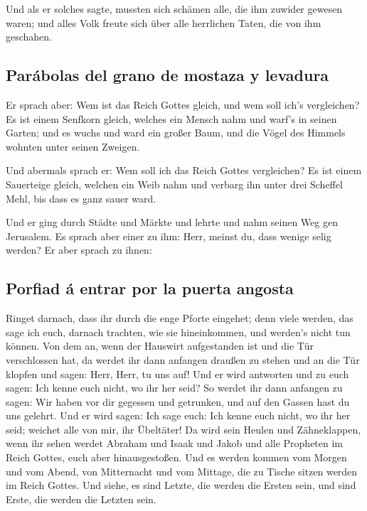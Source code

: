  Und als er solches sagte, mussten sich schämen alle, die
ihm zuwider gewesen waren; und alles Volk freute sich über alle
herrlichen Taten, die von ihm geschahen.

\hypertarget{paruxe1bolas-del-grano-de-mostaza-y-levadura}{%
\subsection{Parábolas del grano de mostaza y
levadura}\label{paruxe1bolas-del-grano-de-mostaza-y-levadura}}

 Er sprach aber: Wem ist das Reich Gottes gleich, und wem
soll ich's vergleichen?  Es ist einem Senfkorn gleich,
welches ein Mensch nahm und warf's in seinen Garten; und es wuchs und
ward ein großer Baum, und die Vögel des Himmels wohnten unter seinen
Zweigen.

 Und abermals sprach er: Wem soll ich das Reich Gottes
vergleichen?  Es ist einem Sauerteige gleich, welchen ein
Weib nahm und verbarg ihn unter drei Scheffel Mehl, bis dass es ganz
sauer ward.

 Und er ging durch Städte und Märkte und lehrte und nahm
seinen Weg gen Jerusalem.  Es sprach aber einer zu ihm:
Herr, meinst du, dass wenige selig werden? Er aber sprach zu ihnen:

\hypertarget{porfiad-uxe1-entrar-por-la-puerta-angosta}{%
\subsection{Porfiad á entrar por la puerta
angosta}\label{porfiad-uxe1-entrar-por-la-puerta-angosta}}

 Ringet darnach, dass ihr durch die enge Pforte eingehet;
denn viele werden, das sage ich euch, darnach trachten, wie sie
hineinkommen, und werden's nicht tun können.  Von dem an,
wenn der Hauswirt aufgestanden ist und die Tür verschlossen hat, da
werdet ihr dann anfangen draußen zu stehen und an die Tür klopfen und
sagen: Herr, Herr, tu uns auf! Und er wird antworten und zu euch sagen:
Ich kenne euch nicht, wo ihr her seid?  So werdet ihr
dann anfangen zu sagen: Wir haben vor dir gegessen und getrunken, und
auf den Gassen hast du uns gelehrt.  Und er wird sagen:
Ich sage euch: Ich kenne euch nicht, wo ihr her seid; weichet alle von
mir, ihr Übeltäter!  Da wird sein Heulen und
Zähneklappen, wenn ihr sehen werdet Abraham und Isaak und Jakob und alle
Propheten im Reich Gottes, euch aber hinausgestoßen.  Und
es werden kommen vom Morgen und vom Abend, von Mitternacht und vom
Mittage, die zu Tische sitzen werden im Reich Gottes. 
Und siehe, es sind Letzte, die werden die Ersten sein, und sind Erste,
die werden die Letzten sein.

